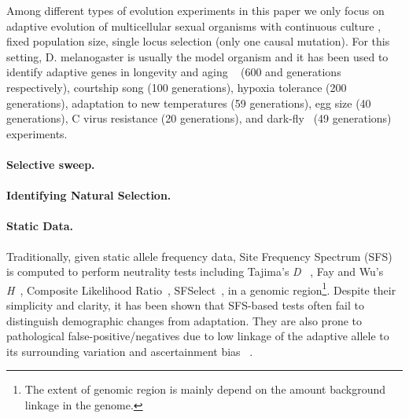 \documentclass[11pt]{article}
\begin{document}
Among different types of evolution experiments 
\cite{Barrick2013Genome,schlotterer2015combining} in 
this 
paper we only focus on adaptive evolution of multicellular sexual organisms 
with 
continuous culture
, fixed population size, single locus selection (only one 
causal mutation). 
For this setting, D. melanogaster is 
usually the model organism and it has been used to identify adaptive genes in 
longevity and aging ~\cite{burke2010genome,remolina2012genomic} (600 and  
generations respectively),
courtship song \cite{turner2011population} (100 generations),
hypoxia tolerance \cite{zhou2011experimental} (200 generations),
adaptation to new temperatures\cite{orozco2012adaptation,tobler2014massive} (59 
generations),
egg size \cite{jha2015whole} (40 generations),
C virus resistance \cite{martins2014host} (20 generations),
and dark-fly~\cite{izutsu2015dynamics} (49 generations) experiments.



\paragraph{Selective sweep.} 
\paragraph{Identifying Natural Selection.} 
\paragraph{Static Data.} Traditionally, given static allele frequency data, 
Site Frequency Spectrum 
(SFS) is computed to perform neutrality tests including Tajima's \emph{D} 
~\cite{tajima1989statistical}, 
Fay and Wu's \emph{H}~\cite{fay2000hitchhiking}, 
Composite Likelihood Ratio~\cite{nielsen2005genomic}, 
SFSelect~\cite{ronen2013learning}, in a genomic 
region\footnote{The extent of genomic region is mainly depend on the  amount 
background linkage in the genome.}. Despite their simplicity and clarity, 
it has been shown that
  SFS-based tests often fail to distinguish demographic changes from 
  adaptation. They 
  are also prone to pathological false-positive/negatives
  due to low linkage of the adaptive allele to its surrounding variation and 
  ascertainment bias ~\cite{ptak2002evidence, 
  ramos2002statistical,akey2009constructing, 
  nielsen2003correcting,messer2013population}. 
\end{document}

